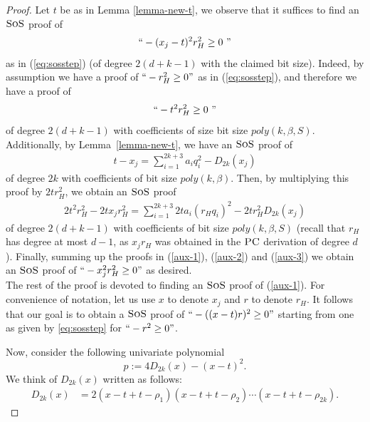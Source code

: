 \documentclass[11pt]{article}
\newcommand{\sos}{\text{\sc{SoS}}}
\newcommand{\PC}{\textsc{PC}}
\newcommand{\1}{\textbf{1}}
\begin{document}
\begin{proof}
Let $t$ be as in Lemma \ref{lemma-new-t}, we observe that it suffices to find an $\sos$ proof of 
\begin{align}\label{aux-1}
``-(x_j-t)^2r_H^2 \geq 0 \ "
\end{align}
as in (\ref{eq:sosstep}) (of degree $2(d+k-1)$ with the claimed bit size). Indeed, by assumption we have a proof of $``-r_H^2\geq 0"$ as in (\ref{eq:sosstep}), and therefore we have a proof of 
\begin{align}\label{aux-2}
``-t^2r_H^2\geq 0 \ "
\end{align}
of degree $2(d+k-1)$ with coefficients of size bit size $poly(k,\beta,S)$. Additionally, by Lemma~\ref{lemma-new-t}, we have an $\sos$ proof of 
\begin{align}
    t - x_j = \sum_{i=1}^{2k+3}a_iq_i^2 - D_{2k}(x_j) 
\end{align}
of degree $2k$ with coefficients of bit size $poly(k,\beta)$. Then, by multiplying this proof by $2t r_H^2$, we obtain an $\sos$ proof 
\begin{align} \label{aux-3} 
   2t^2r_H^2- 2t x_j r_H^2  = \sum_{i=1}^{2k+3}2ta_i(r_Hq_i)^2  - 2tr_H^2D_{2k}(x_j)  
\end{align}
of degree $2(d+k-1)$ with coefficients of bit size $poly(k,\beta, S)$ (recall that $r_H$ has degree at most $d-1$, as $x_jr_H$ was obtained in the $\PC$ derivation of degree $d$). Finally, summing up the proofs in (\ref{aux-1}), (\ref{aux-2}) and (\ref{aux-3}) we obtain an $\sos$ proof of $``-x_j^2r_H^2\geq0"$ as desired.
\\

The rest of the proof is devoted to finding an $\sos$ proof of (\ref{aux-1}). For convenience of notation, let us  use $x$ to denote $x_j$ and $r$ to denote $r_{H}$.    
It follows that our goal is to obtain a $\sos$ proof of $``-((x-t)r)^2\geq 0"$ starting from one as given by \eqref{eq:sosstep} for $``-r^2\geq 0"$. 

Now, consider the following univariate polynomial 
$$p:= 4D_{2k}(x) - (x-t)^2.$$
%
We think of $D_{2k}(x)$ written as follows:
\begin{align}
D_{2k}(x)&=2(x-t+t-\rho_{1})(x-t+t-\rho_{2})\cdots (x-t+t-\rho_{2k}).     \label{eq:domain_f_rootsM}
%
\end{align}
%


\end{proof}
\end{document}
